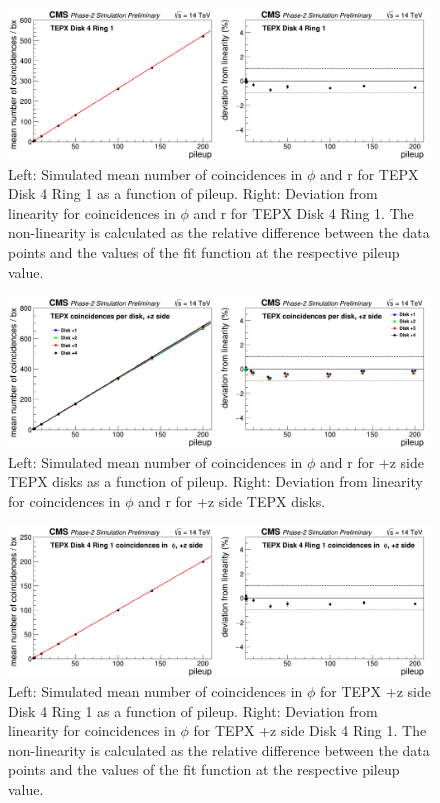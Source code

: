\begin{figure}[H]
  \centering
  \includegraphics[width=1\columnwidth]{./totalcoincidencesD4R1.png}
  \caption{Left: Simulated mean number of coincidences in $\phi$ and r for TEPX Disk 4 Ring 1 as a function of pileup. Right: Deviation from linearity for coincidences in $\phi$ and r for TEPX Disk 4 Ring 1. The non-linearity is calculated as the relative difference between the data points and the values of the fit function at the respective pileup value.}
  \label{fig:CMS}
\end{figure}





\begin{figure}[H]
  \centering
  \includegraphics[width=1\columnwidth]{./coincidencesperdisk+z.png}
  \caption{Left: Simulated mean number of coincidences in $\phi$ and r for +z side TEPX disks as a function of pileup. Right: Deviation from linearity for coincidences in $\phi$ and r for +z side TEPX disks.}
  \label{fig:CMS}
\end{figure}


\begin{figure}[H]
  \centering
  \includegraphics[width=1\columnwidth]{./coincidencesinphiD4R1z+.png}
  \caption{Left: Simulated mean number of coincidences in $\phi$ for TEPX +z side Disk 4 Ring 1 as a function of pileup. Right: Deviation from linearity for coincidences in $\phi$ for TEPX +z side Disk 4 Ring 1. The non-linearity is calculated as the relative difference between the data points and the values of the fit function at the respective pileup value.}
  \label{fig:CMS}
\end{figure}



